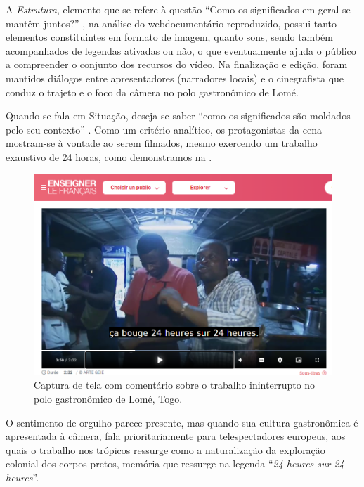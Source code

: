 \documentclass[portuguese]{textolivre}
\begin{document}
A \emph{Estrutura}, elemento que se refere à questão “Como os significados em geral se mantêm juntos?” \cite[p. 293]{kalantzis_letramentos_2020}, na análise do webdocumentário reproduzido, possui tanto elementos constituintes em formato de imagem, quanto sons, sendo também acompanhados de legendas ativadas ou não, o que eventualmente ajuda o público a compreender o conjunto dos recursos do vídeo. Na finalização e edição, foram mantidos diálogos entre apresentadores (narradores locais) e o cinegrafista que conduz o trajeto e o foco da câmera no polo gastronômico de  Lomé. 

Quando se fala em Situação, deseja-se saber “como os significados são moldados pelo seu contexto” \cite[p. 293]{kalantzis_letramentos_2020}. Como um critério analítico, os protagonistas da cena mostram-se à vontade ao serem filmados, mesmo exercendo um trabalho exaustivo de 24 horas, como demonstramos na .

\begin{figure}[h!]
    \centering
    \begin{minipage}{.55\textwidth}
    \includegraphics[width=\linewidth]{Fig8.png}
    \caption{Captura de tela com comentário sobre o trabalho ininterrupto no polo gastronômico de Lomé, Togo.}
    \label{fig8}
    \end{minipage}
\end{figure}

O sentimento de orgulho parece presente, mas quando sua cultura gastronômica é apresentada à câmera, fala prioritariamente para telespectadores europeus, aos quais o trabalho nos trópicos ressurge como a naturalização da exploração colonial dos corpos pretos, memória que ressurge na legenda “\textit{24 heures sur 24 heures}”. 
\end{document}
